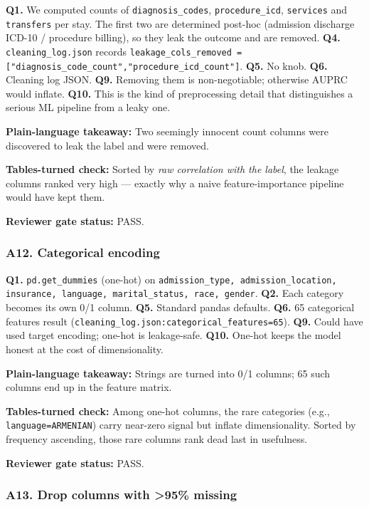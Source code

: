 \documentclass{article}
\begin{document}
\textbf{Q1.} We computed counts of \texttt{diagnosis\_codes}, \texttt{procedure\_icd}, \texttt{services} and \texttt{transfers} per stay. The first two are determined post-hoc (admission discharge ICD-10 / procedure billing), so they leak the outcome and are removed. \textbf{Q4.} \texttt{cleaning\_log.json} records \texttt{leakage\_cols\_removed = ["diagnosis\_code\_count","procedure\_icd\_count"]}. \textbf{Q5.} No knob. \textbf{Q6.} Cleaning log JSON. \textbf{Q9.} Removing them is non-negotiable; otherwise AUPRC would inflate. \textbf{Q10.} This is the kind of preprocessing detail that distinguishes a serious ML pipeline from a leaky one.


\textbf{Plain-language takeaway:} Two seemingly innocent count columns were discovered to leak the label and were removed.


\textbf{Tables-turned check:} Sorted by \emph{raw correlation with the label}, the leakage columns ranked very high --- exactly why a naive feature-importance pipeline would have kept them.


\textbf{Reviewer gate status:} PASS.


\subsubsection{A12. Categorical encoding}


\textbf{Q1.} \texttt{pd.get\_dummies} (one-hot) on \texttt{admission\_type, admission\_location, insurance, language, marital\_status, race, gender}. \textbf{Q2.} Each category becomes its own 0/1 column. \textbf{Q5.} Standard pandas defaults. \textbf{Q6.} 65 categorical features result (\texttt{cleaning\_log.json:categorical\_features=65}). \textbf{Q9.} Could have used target encoding; one-hot is leakage-safe. \textbf{Q10.} One-hot keeps the model honest at the cost of dimensionality.


\textbf{Plain-language takeaway:} Strings are turned into 0/1 columns; 65 such columns end up in the feature matrix.


\textbf{Tables-turned check:} Among one-hot columns, the rare categories (e.g., \texttt{language=ARMENIAN}) carry near-zero signal but inflate dimensionality. Sorted by frequency ascending, those rare columns rank dead last in usefulness.


\textbf{Reviewer gate status:} PASS.


\subsubsection{A13. Drop columns with >95\% missing}
\end{document}
